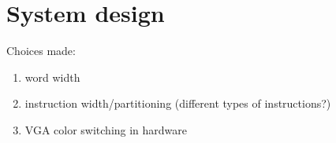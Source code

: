 \section{System design}

Choices made:
\begin{enumerate}
\item word width
\item instruction width/partitioning (different types of instructions?)
\item VGA color switching in hardware
\end{enumerate}
